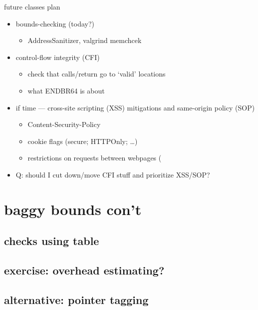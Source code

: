 \begin{frame}{future classes plan}
    \begin{itemize}
    \item bounds-checking (today?)
        \begin{itemize}
        \item AddressSanitizer, valgrind memchcek
        \end{itemize}
    \item control-flow integrity (CFI)
        \begin{itemize}
        \item check that calls/return go to `valid' locations
        \item what ENDBR64 is about
        \end{itemize}
    \item if time --- cross-site scripting (XSS) mitigations and same-origin policy (SOP)
        \begin{itemize}
        \item Content-Security-Policy
        \item cookie flags (secure; HTTPOnly; \ldots)
        \item restrictions on requests between webpages (
        \end{itemize}
    \item Q: should I cut down/move CFI stuff and prioritize XSS/SOP?
    \end{itemize}
\end{frame}

\section{baggy bounds con't}
\subsection{checks using table}


\subsection{exercise: overhead estimating?}


\subsection{alternative: pointer tagging}


